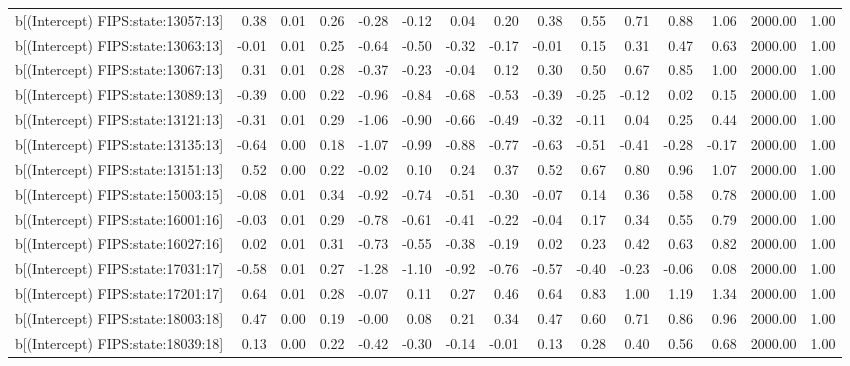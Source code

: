 \begin{table}[ht]
\begin{tabular}{rrrrrrrrrrrrrrr}
  b[(Intercept) FIPS:state:13057:13] & 0.38 & 0.01 & 0.26 & -0.28 & -0.12 & 0.04 & 0.20 & 0.38 & 0.55 & 0.71 & 0.88 & 1.06 & 2000.00 & 1.00 \\ 
  b[(Intercept) FIPS:state:13063:13] & -0.01 & 0.01 & 0.25 & -0.64 & -0.50 & -0.32 & -0.17 & -0.01 & 0.15 & 0.31 & 0.47 & 0.63 & 2000.00 & 1.00 \\ 
  b[(Intercept) FIPS:state:13067:13] & 0.31 & 0.01 & 0.28 & -0.37 & -0.23 & -0.04 & 0.12 & 0.30 & 0.50 & 0.67 & 0.85 & 1.00 & 2000.00 & 1.00 \\ 
  b[(Intercept) FIPS:state:13089:13] & -0.39 & 0.00 & 0.22 & -0.96 & -0.84 & -0.68 & -0.53 & -0.39 & -0.25 & -0.12 & 0.02 & 0.15 & 2000.00 & 1.00 \\ 
  b[(Intercept) FIPS:state:13121:13] & -0.31 & 0.01 & 0.29 & -1.06 & -0.90 & -0.66 & -0.49 & -0.32 & -0.11 & 0.04 & 0.25 & 0.44 & 2000.00 & 1.00 \\ 
  b[(Intercept) FIPS:state:13135:13] & -0.64 & 0.00 & 0.18 & -1.07 & -0.99 & -0.88 & -0.77 & -0.63 & -0.51 & -0.41 & -0.28 & -0.17 & 2000.00 & 1.00 \\ 
  b[(Intercept) FIPS:state:13151:13] & 0.52 & 0.00 & 0.22 & -0.02 & 0.10 & 0.24 & 0.37 & 0.52 & 0.67 & 0.80 & 0.96 & 1.07 & 2000.00 & 1.00 \\ 
  b[(Intercept) FIPS:state:15003:15] & -0.08 & 0.01 & 0.34 & -0.92 & -0.74 & -0.51 & -0.30 & -0.07 & 0.14 & 0.36 & 0.58 & 0.78 & 2000.00 & 1.00 \\ 
  b[(Intercept) FIPS:state:16001:16] & -0.03 & 0.01 & 0.29 & -0.78 & -0.61 & -0.41 & -0.22 & -0.04 & 0.17 & 0.34 & 0.55 & 0.79 & 2000.00 & 1.00 \\ 
  b[(Intercept) FIPS:state:16027:16] & 0.02 & 0.01 & 0.31 & -0.73 & -0.55 & -0.38 & -0.19 & 0.02 & 0.23 & 0.42 & 0.63 & 0.82 & 2000.00 & 1.00 \\ 
  b[(Intercept) FIPS:state:17031:17] & -0.58 & 0.01 & 0.27 & -1.28 & -1.10 & -0.92 & -0.76 & -0.57 & -0.40 & -0.23 & -0.06 & 0.08 & 2000.00 & 1.00 \\ 
  b[(Intercept) FIPS:state:17201:17] & 0.64 & 0.01 & 0.28 & -0.07 & 0.11 & 0.27 & 0.46 & 0.64 & 0.83 & 1.00 & 1.19 & 1.34 & 2000.00 & 1.00 \\ 
  b[(Intercept) FIPS:state:18003:18] & 0.47 & 0.00 & 0.19 & -0.00 & 0.08 & 0.21 & 0.34 & 0.47 & 0.60 & 0.71 & 0.86 & 0.96 & 2000.00 & 1.00 \\ 
  b[(Intercept) FIPS:state:18039:18] & 0.13 & 0.00 & 0.22 & -0.42 & -0.30 & -0.14 & -0.01 & 0.13 & 0.28 & 0.40 & 0.56 & 0.68 & 2000.00 & 1.00 \\ 

\end{tabular}
\end{table}
